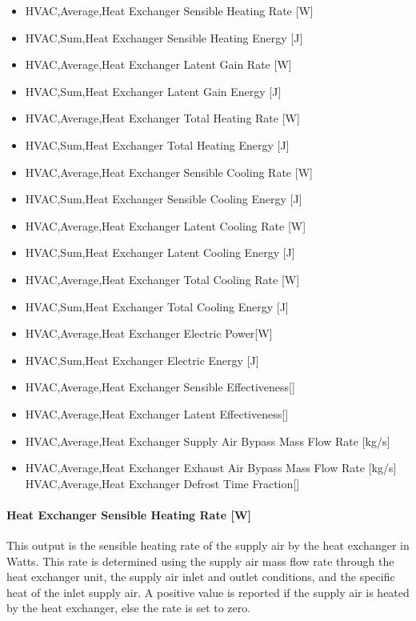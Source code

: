 \begin{itemize}
\item
  HVAC,Average,Heat Exchanger Sensible Heating Rate {[}W{]}
\item
  HVAC,Sum,Heat Exchanger Sensible Heating Energy {[}J{]}
\item
  HVAC,Average,Heat Exchanger Latent Gain Rate {[}W{]}
\item
  HVAC,Sum,Heat Exchanger Latent Gain Energy {[}J{]}
\item
  HVAC,Average,Heat Exchanger Total Heating Rate {[}W{]}
\item
  HVAC,Sum,Heat Exchanger Total Heating Energy {[}J{]}
\item
  HVAC,Average,Heat Exchanger Sensible Cooling Rate {[}W{]}
\item
  HVAC,Sum,Heat Exchanger Sensible Cooling Energy {[}J{]}
\item
  HVAC,Average,Heat Exchanger Latent Cooling Rate {[}W{]}
\item
  HVAC,Sum,Heat Exchanger Latent Cooling Energy {[}J{]}
\item
  HVAC,Average,Heat Exchanger Total Cooling Rate {[}W{]}
\item
  HVAC,Sum,Heat Exchanger Total Cooling Energy {[}J{]}
\item
  HVAC,Average,Heat Exchanger Electric Power{[}W{]}
\item
  HVAC,Sum,Heat Exchanger Electric Energy {[}J{]}
\item
  HVAC,Average,Heat Exchanger Sensible Effectiveness{[]}
\item
  HVAC,Average,Heat Exchanger Latent Effectiveness{[]}
\item
  HVAC,Average,Heat Exchanger Supply Air Bypass Mass Flow Rate {[}kg/s{]}
\item
  HVAC,Average,Heat Exchanger Exhaust Air Bypass Mass Flow Rate {[}kg/s{]} HVAC,Average,Heat Exchanger Defrost Time Fraction{[]}
\end{itemize}

\paragraph{Heat Exchanger Sensible Heating Rate {[}W{]}}\label{heat-exchanger-sensible-heating-rate-w-1}

This output is the sensible heating rate of the supply air by the heat exchanger in Watts. This rate is determined using the supply air mass flow rate through the heat exchanger unit, the supply air inlet and outlet conditions, and the specific heat of the inlet supply air. A positive value is reported if the supply air is heated by the heat exchanger, else the rate is set to zero.

